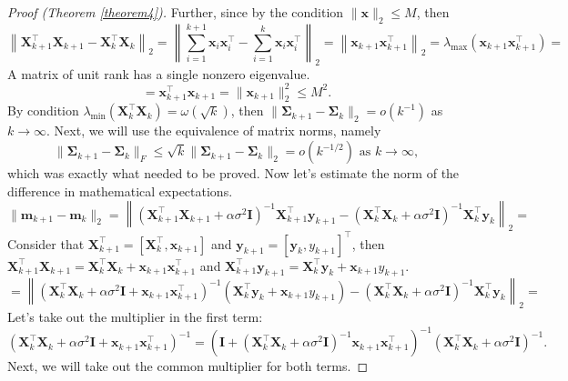 \documentclass[
11pt,%
tightenlines,%
twoside,%
onecolumn,%
nofloats,%
nobibnotes,%
nofootinbib,%
superscriptaddress,%
noshowpacs,%
centertags]%
{revtex4-2}
\begin{document}
\begin{proof}[Proof (Theorem \ref{theorem4})]
Further, since by the condition $\|\mathbf{x}\|_2 \leqslant M$, then
    \[ \left\| \mathbf{X}^{\top}_{k+1} \mathbf{X}_{k+1} - \mathbf{X}^{\top}_k \mathbf{X}_k \right\|_2 = \left\| \sum\limits_{i=1}^{k+1} \mathbf{x}_i \mathbf{x}_i^{\top} - \sum\limits_{i=1}^{k} \mathbf{x}_i \mathbf{x}_i^{\top} \right\|_2 = \left\| \mathbf{x}_{k+1} \mathbf{x}_{k+1}^{\top} \right\|_2 = \lambda_{\max}\left( \mathbf{x}_{k+1} \mathbf{x}_{k+1}^{\top} \right) = \]
    A matrix of unit rank has a single nonzero eigenvalue.
    \[= \mathbf{x}_{k+1}^{\top} \mathbf{x}_{k+1} = \| \mathbf{x}_{k+1}\|_2^2 \leqslant M^2. \]
By condition $\lambda_{\min}\left(\mathbf{X}^{\top}_k\mathbf{X}_k \right) = \omega(\sqrt{k})$, then $\|\mathbf{\Sigma}_{k+1} - \mathbf{\Sigma}_k\|_2 = o(k^{-1})$ as $k\to \infty$. Next, we will use the equivalence of matrix norms, namely
    \[ \|\mathbf{\Sigma}_{k+1} - \mathbf{\Sigma}_k \|_F \leqslant\sqrt{k}\|\mathbf{\Sigma}_{k+1} - \mathbf{\Sigma}_k\|_2 = o(k^{-1/2}) \text{ as } k\to \infty, \]
    which was exactly what needed to be proved. Now let's estimate the norm of the difference in mathematical expectations.
    \[ \| \mathbf{m}_{k+1} - \mathbf{m}_k \|_2 = \left\| \left( \mathbf{X}_{k+1}^{\top} \mathbf{X}_{k+1} + \alpha \sigma^2 \mathbf{I} \right)^{-1} \mathbf{X}_{k+1}^{\top} \mathbf{y}_{k+1} - \left( \mathbf{X}_k^{\top} \mathbf{X}_k + \alpha \sigma^2 \mathbf{I} \right)^{-1} \mathbf{X}_k^{\top} \mathbf{y}_k \right\|_2 = \]
    Consider that $\mathbf{X}_{k+1}^{\top} = [\mathbf{X}_k^{\top},\mathbf{x}_{k+1}]$ and $\mathbf{y}_{k+1} = [\mathbf{y}_k, y_{k+1}]^{\top}$, then $\mathbf{X}_{k+1}^{\top}\mathbf{X}_{k+1} = \mathbf{X}_k^{\top} \mathbf{X}_k +\mathbf{x}_{k+1} \mathbf{x}_{k+1}^{\top}$ and $\mathbf{X}_{k+1}^{\top}\mathbf{y}_{k+1} = \mathbf{X}_k^{\top} \mathbf{y}_k + \mathbf{x}_{k+1} y_{k+1}$.
    \[ = \left\| \left( \mathbf{X}_k^{\top} \mathbf{X}_k + \alpha \sigma^2 \mathbf{I} + \mathbf{x}_{k+1} \mathbf{x}_{k+1}^{\top} \right)^{-1} \left( \mathbf{X}_k^{\top} \mathbf{y}_k + \mathbf{x}_{k+1} y_{k+1} \right) - \left( \mathbf{X}_k^{\top} \mathbf{X}_k + \alpha \sigma^2 \mathbf{I} \right)^{-1} \mathbf{X}_k^{\top} \mathbf{y}_k \right\|_2 = \]
    Let's take out the multiplier in the first term:
\[\left(\mathbf{X}_k^{\top} \mathbf{X}_k+ \alpha\sigma^2 \mathbf{I} +\mathbf{x}_{k+1}\mathbf{x}_{k+1}^{\top}\right)^{-1}= \left(\mathbf{I} + \left( \mathbf{X}_k^{\top}\mathbf{X}_k +\alpha \sigma^2 \mathbf{I}\right)^{-1}\mathbf{x}_{k+1}\mathbf{x}_{k+1}^{\top}\right)^{-1} \left(\mathbf{X}_k^{\top} \mathbf{X}_k + \alpha \sigma^2 \mathbf{I}\right)^{-1}.\]
Next, we will take out the common multiplier for both terms.

\end{proof}
\end{document}
